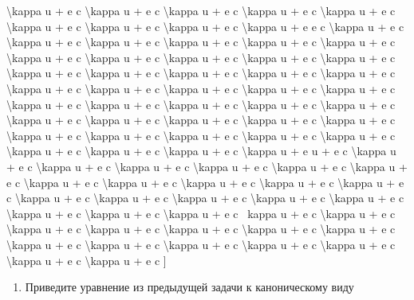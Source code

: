 \documentclass[
]{article}
\providecommand{\tightlist}{%
  \setlength{\itemsep}{0pt}\setlength{\parskip}{0pt}}
\begin{document}
\textbackslash kappa u + e c \textbackslash kappa u + e c
\textbackslash kappa u + e c \textbackslash kappa u + e c
\textbackslash kappa u + e c \textbackslash kappa u + e c
\textbackslash kappa u + e c \textbackslash kappa u + e c
\textbackslash kappa u + e e c \textbackslash kappa u + e c
\textbackslash kappa u + e c \textbackslash kappa u + e c
\textbackslash kappa u + e c \textbackslash kappa u + e c
\textbackslash kappa u + e c \textbackslash kappa u + e c
\textbackslash kappa u + e c \textbackslash kappa u + e c
\textbackslash kappa u + e c \textbackslash kappa u + e c
\textbackslash kappa u + e c \textbackslash kappa u + e c
\textbackslash kappa u + e c \textbackslash kappa u + e c
\textbackslash kappa u + e c \textbackslash kappa u + e c
\textbackslash kappa u + e c \textbackslash kappa u + e c
\textbackslash kappa u + e c \textbackslash kappa u + e c
\textbackslash kappa u + e c \textbackslash kappa u + e c
\textbackslash kappa u + e c \textbackslash kappa u + e c
\textbackslash kappa u + e c \textbackslash kappa u + e c
\textbackslash kappa u + e c \textbackslash kappa u + e c
\textbackslash kappa u + e c \textbackslash kappa u + e c
\textbackslash kappa u + e c \textbackslash kappa u + e c
\textbackslash kappa u + e c \textbackslash kappa u + e c
\textbackslash kappa u + e c \textbackslash kappa u + e c
\textbackslash kappa u + e c \textbackslash kappa u + e c
\textbackslash kappa u + e u + e c \textbackslash kappa u + e c
\textbackslash kappa u + e c \textbackslash kappa u + e c
\textbackslash kappa u + e c \textbackslash kappa u + e c
\textbackslash kappa u + e c \textbackslash kappa u + e c
\textbackslash kappa u + e c \textbackslash kappa u + e c
\textbackslash kappa u + e c \textbackslash kappa u + e c
\textbackslash kappa u + e c \textbackslash kappa u + e c
\textbackslash kappa u + e c \textbackslash kappa u + e c
\textbackslash kappa u + e c \textbackslash kappa u + e c
\textbackslash kappa u + e c \textbackslash kappa u + e c ~kappa u + e c
\textbackslash kappa u + e c \textbackslash kappa u + e c
\textbackslash kappa u + e c \textbackslash kappa u + e c
\textbackslash kappa u + e c \textbackslash kappa u + e c
\textbackslash kappa u + e c \textbackslash kappa u + e c
\textbackslash kappa u + e c \textbackslash kappa u + e c
\textbackslash kappa u + e c \textbackslash kappa u + e c
\textbackslash kappa u + e c {]}

\begin{enumerate}
\def\labelenumi{\arabic{enumi}.}
\setcounter{enumi}{3}
\tightlist
\item
  Приведите уравнение из предыдущей задачи к каноническому виду
\end{enumerate}
\end{document}
